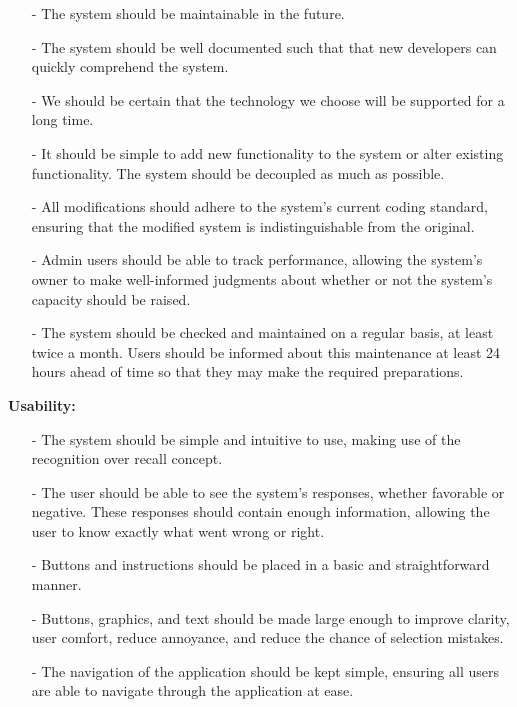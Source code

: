 \documentclass[hidelinks, 12pt, a4paper]{article}
\begin{document}
\begin{itemize}
      \item[-] The system should be maintainable in the future.
      \item [-] The system should be well documented such that that new developers can quickly comprehend  the system.
      \item[-] We should be certain that the technology we choose will be supported for a long time.
      \item [-] It should be simple to add new functionality to the system or alter existing functionality. The system should be decoupled as much as possible.
      \item[-] All modifications should adhere to the system's current coding standard, ensuring that the modified system is indistinguishable from the original.
      \item [-] Admin users should be able to track performance, allowing the system's owner to make well-informed judgments about whether or not the system's capacity should be raised.
      \item[-] The system should be checked and maintained on a regular basis, at least twice a month. Users should be informed about this maintenance at least 24 hours ahead of time so that they may make the required preparations.


\end{itemize}
\vspace{0.5cm}
\large{ \textbf{Usability:}}
\begin{itemize}
      \item[-] The system should be simple and intuitive to use, making use of the recognition over recall concept.
            \item[-]The user should be able to see the system's responses, whether favorable or negative. These responses should contain enough information, allowing the user to know exactly what went wrong or right.
      \item[-] Buttons and instructions should be placed in a basic and straightforward manner.
            \item[-]Buttons, graphics, and text should be made large enough to improve clarity, user comfort, reduce annoyance, and reduce the chance of selection mistakes.
            \item[-]The navigation of the application should be kept simple, ensuring all users are able to navigate through the application at ease.

\end{itemize}
\end{document}
